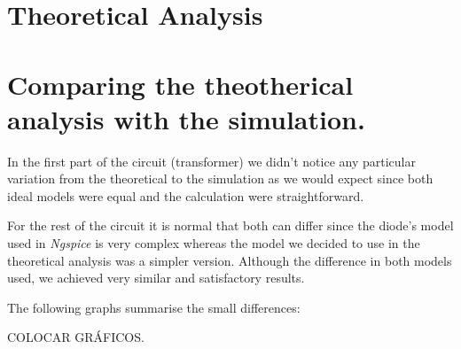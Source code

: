 \newpage
\section{Theoretical Analysis}
\label{sec:analysis}

\section{Comparing the theotherical analysis with the simulation.}\label{sec:Comparison}
In the first part of the circuit (transformer) we didn't notice any particular variation from the theoretical to the simulation
as we would expect since both ideal models were equal and the calculation were straightforward.

For the rest of the circuit it is normal that both can differ since the diode's model used in \emph{Ngspice}
is very complex whereas the model we decided to use in the theoretical analysis was
a simpler version.
Although the difference in both models used, we achieved very similar and satisfactory results.

The following graphs summarise the small differences:

COLOCAR GRÁFICOS.

\newpage




